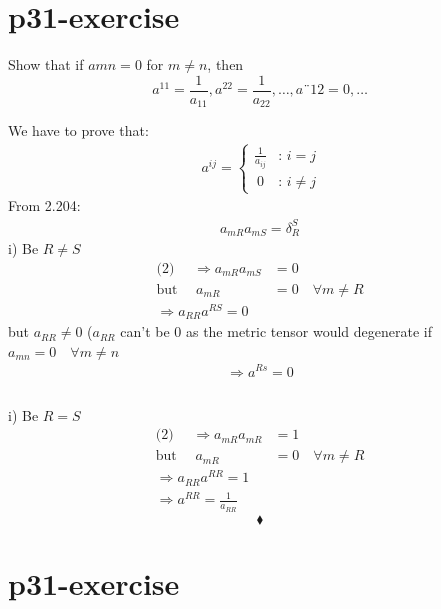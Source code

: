\section{p31-exercise}

\begin{tcolorbox}
Show that if $a{mn} = 0$ for $m\neq n$, then $$a^{11} = \frac{1}{a_{11}}, a^{22} = \frac{1}{a_{22}}, \dots, a¨{12} = 0, \dots$$
\end{tcolorbox}
We have to prove that:
\begin{align}
\ a^{ij} = \left\{\begin{array}{cc}
\frac{1}{a_{ij}} & \text{: }i=j\\
\ 0 & \text{: }i \neq j
\end{array}\right.
\end{align}
From 2.204:
\begin{align}
a_{mR}a_{mS} = \delta^S_R
\end{align}
i) Be $R \neq S$
\begin{align}
\text{(2) }\quad \Rightarrow a_{mR}a_{mS} &= 0\\
\text{but } \quad a_{mR} &=0\quad \forall m \neq R\\
\Rightarrow a_{RR}a^{RS} = 0
\end{align}
but $a_{RR} \neq 0$ ($a_{RR}$ can't be $0$ as the metric tensor would degenerate  if $a_{mn} = 0\quad \forall m \neq n$
\begin{align}
\Rightarrow a^{Rs} = 0\\\\
\end{align}

i) Be $R = S$
\begin{align}
\text{(2) }\quad \Rightarrow a_{mR}a_{mR} &= 1\\
\text{but } \quad a_{mR} &=0\quad \forall m \neq R\\
\Rightarrow a_{RR}a^{RR} = 1\\
\Rightarrow a^{RR} = \frac{1}{a_{RR}}
\end{align}
$$\blacklozenge$$
\newpage

\section{p31-exercise}

